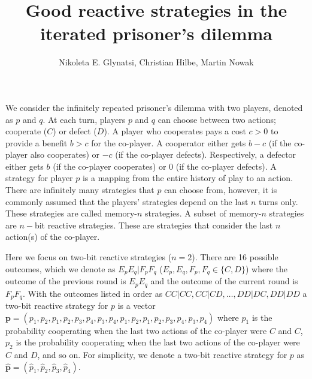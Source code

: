 \documentclass{article}
\title{\vspace{-2cm} Good reactive strategies in the iterated prisoner's dilemma}
\author{Nikoleta E. Glynatsi, Christian Hilbe, Martin Nowak}
\date{}
\theoremstyle{definition}
\begin{document}
\maketitle

\vspace{-.5cm}

We consider the infinitely repeated prisoner's dilemma with two players, denoted
as \(p\) and \(q\). At each turn, players \(p\) and \(q\) can choose between two
actions; cooperate (\(C\)) or defect (\(D\)). A player who cooperates pays a
cost \(c > 0\) to provide a benefit \(b > c\) for the co-player. A cooperator
either gets \(b - c\) (if the co-player also cooperates) or \(-c\) (if the
co-player defects). Respectively, a defector either gets \(b\) (if the co-player
cooperates) or 0 (if the co-player defects). A strategy for player \(p\) is a
mapping from the entire history of play to an action. There are infinitely many
strategies that \(p\) can choose from, however, it is commonly assumed that the
players' strategies depend on the last \(n\) turns only. These strategies are
called memory-\(n\) strategies. A subset of memory-\(n\) strategies are
\(n-\)bit reactive strategies. These are strategies that consider the last \(n\)
action(s) of the co-player.

Here we focus on two-bit reactive strategies (\(n=2\)).
There are 16 possible outcomes, which we denote as \(E_p
E_q | F_p F_q\) (\(E_p, E_q, F_p, F_q \in \{C, D\}\)) where the outcome of the
previous round is \(E_p E_q\) and the outcome of the current round is \(F_p
F_q\). With the outcomes listed in order as \(CC|CC, CC|CD, \dots, DD|DC,
DD|DD\)  a two-bit reactive strategy for \(p\) is a vector \(\mathbf{p} = (p_1,
p_2, p_1, p_2, p_3, p_4, p_3, p_4, p_1, p_2, p_1, p_2, p_3, p_4, \allowbreak
p_3, p_4)\) where \(p_1\) is the probability cooperating when the last two
actions of the co-player were \(C\) and \(C\), \(p_2\) is the probability
cooperating when the last two actions of the co-player were \(C\) and \(D\), and
so on. For simplicity, we denote a two-bit reactive strategy for \(p\) as
\(\mathbf{\hat{p}} = (\hat{p}_1, \hat{p}_2, \hat{p}_3, \hat{p}_4)\).

\end{document}
